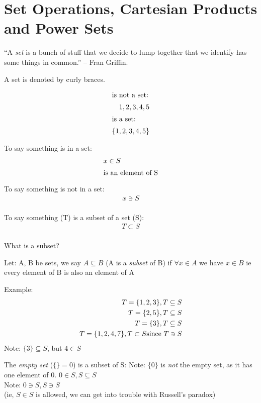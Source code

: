 \section{Set Operations, Cartesian Products and Power Sets}
\label{sec:Sets}

``A \emph{set} is a bunch of stuff that we decide to lump together that we identify has some things in common.'' -- Fran Griffin.

A set is denoted by curly braces.

\begin{align}
\intertext{is not a set:}
  1, 2, 3, 4, 5 \\
\intertext{is a set:}
  \{1, 2, 3, 4, 5 \} \\
\end{align}

To say something is in a set:
\begin{align}
  x \in S \\
  \intertext{is an element of S}
\end{align}

To say something is not in a set:
\begin{align}
  x \ni S \\
\end{align}

To say something (T) is a subset of a set (S):
\begin{align}
  T \subset S \\
\end{align}

What is a subset?

Let: A, B be sets, we say  $A \subseteq B$ (A is a \emph{subset} of B) if $\forall x \in A$ we have $x \in B$
ie every element of B is also an element of A

Example:
\begin{align}
  T = \{ 1, 2, 3\}, T \subseteq S \\
  T = \{ 2, 5 \}, T \subseteq S \\
  T = \{ 3 \}, T \subseteq S \\
  T = \{ 1, 2, 4, 7 \}, T \subset S \text{since $ T \ni S $}
\end{align}
Note: $\{3\} \subseteq S $, but $ 4 \in S $

The \emph{empty set} ($\{\} = 0$) is a subset of S:
Note: $\{0\}$ is \emph{not} the empty set, as it has one element of 0.
$0 \in S, S \subseteq S$ \\ 
Note:  $0 \ni S, S \ni S$ \\
(ie, $S \in S$ is allowed, we can get into trouble with Russell's paradox)\\
\\

